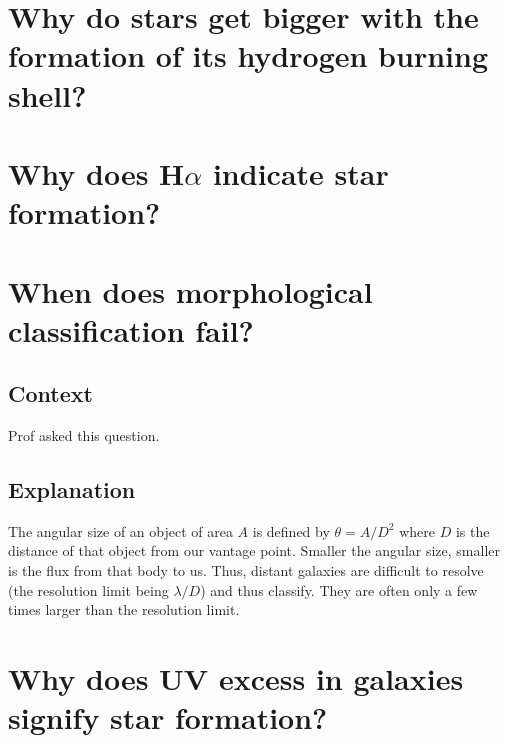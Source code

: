 \documentclass[a4paper,12pt]{article}
\begin{document}

\section{Why do stars get bigger with the formation of its hydrogen burning shell?}


\section{Why does H$\alpha$ indicate star formation?}


\section{When does morphological classification fail?}

\subsection*{Context}
Prof asked this question. 

\subsection*{Explanation}
The angular size of an object of area $A$ is defined by $\theta = A/D^2$ where $D$ is the distance of that object from our vantage point. Smaller the angular size, smaller is the flux from that body to us. Thus, distant galaxies are difficult to resolve (the resolution limit being $\lambda / D$) and thus classify. They are often only a few times larger than the resolution limit.


\section{Why does UV excess in galaxies signify star formation?}

\end{document}
